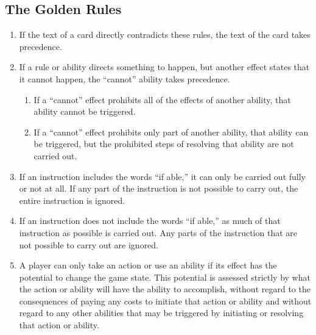 \subsection{The Golden Rules}
\begin{enumerate}
	\item If the text of a card directly contradicts these rules, the text of the card takes precedence.
	\item If a rule or ability directs something to happen, but another effect states that it cannot happen, the ``cannot'' ability takes precedence.
	      \begin{enumerate}
		      \item If a ``cannot'' effect prohibits all of the effects of another ability, that ability cannot be triggered.
		      \item If a ``cannot'' effect prohibits only part of another ability, that ability can be triggered,	but the prohibited steps of resolving that ability are not carried out.
	      \end{enumerate}
	\item If an instruction includes the words ``if able,'' it can only be carried out fully or not at all. If any part of the instruction is not possible to carry out, the entire instruction is ignored.
	\item If an instruction does not include the words ``if able,'' as much of that instruction as possible is carried out. Any parts of the instruction that are not possible to carry out are ignored.
	\item A player can only take an action or use an ability if its effect has the potential to change the game state. This potential is assessed strictly by what the action or ability will have the ability to accomplish, without regard to the consequences of paying any costs to initiate that action or ability and without regard to any other abilities that may be triggered by initiating or resolving that action or ability.\\[10pt]
	      \\[10pt]

\end{enumerate}
